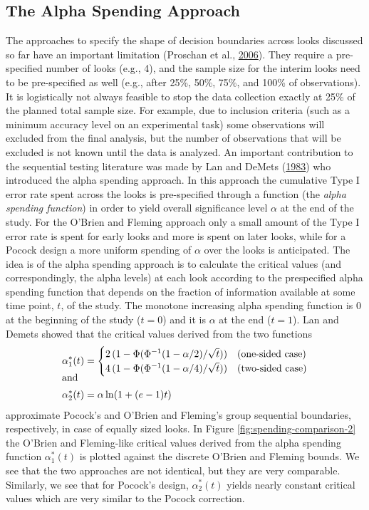 \documentclass[
  english,
  ,man,floatsintext]{apa6}
\begin{document}
\hypertarget{the-alpha-spending-approach}{%
\subsection{The Alpha Spending Approach}\label{the-alpha-spending-approach}}

The approaches to specify the shape of decision boundaries across looks discussed so far have an important limitation (Proschan et al., \protect\hyperlink{ref-proschan_statistical_2006}{2006}). They require a pre-specified number of looks (e.g., 4), and the sample size for the interim looks need to be pre-specified as well (e.g., after 25\%, 50\%, 75\%, and 100\% of observations). It is logistically not always feasible to stop the data collection exactly at 25\% of the planned total sample size. For example, due to inclusion criteria (such as a minimum accuracy level on an experimental task) some observations will excluded from the final analysis, but the number of observations that will be excluded is not known until the data is analyzed. An important contribution to the sequential testing literature was made by Lan and DeMets (\protect\hyperlink{ref-lan_discrete_1983}{1983}) who introduced the alpha spending approach. In this approach the cumulative Type I error rate spent across the looks is pre-specified through a function (the \emph{alpha spending function}) in order to yield overall significance level \(\alpha\) at the end of the study. For the O'Brien and Fleming approach only a small amount of the Type I error rate is spent for early looks and more is spent on later looks, while for a Pocock design a more uniform spending of \(\alpha\) over the looks is anticipated. The idea is of the alpha spending approach is to calculate the critical values (and correspondingly, the alpha levels) at each look according to the prespecified alpha spending function that depends on the fraction of information available at some time point, \(t\), of the study. The monotone increasing alpha spending function is 0 at the beginning of the study (\(t=0\)) and it is \(\alpha\) at the end (\(t=1\)). Lan and Demets showed that the critical values derived from the two functions
\begin{align*}
\alpha_1^*(t)&=
 \begin{cases}
 2\,(1-\Phi(\Phi^{-1}(1-\alpha/2)/\sqrt{t})) &\hbox{(one-sided case)}\\%
 4\,(1-\Phi(\Phi^{-1}(1-\alpha/4)/\sqrt{t})) &\hbox{(two-sided case)}%
\end{cases}\\[-3mm]
 \intertext{and}
 \alpha_2^*(t)&=\alpha \ln(1+(e-1) t)
\end{align*}
approximate Pocock's and O'Brien and Fleming's group sequential boundaries, respectively, in case of equally sized looks. In Figure \ref{fig:spending-comparison-2} the O'Brien and Fleming-like critical values derived from the alpha spending function \(\alpha_1^*(t)\) is plotted against the discrete O'Brien and Fleming bounds. We see that the two approaches are not identical, but they are very comparable. Similarly, we see that for Pocock's design, \(\alpha_2^*(t)\) yields nearly constant critical values which are very similar to the Pocock correction.
\end{document}
